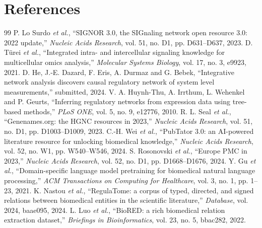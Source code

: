 \documentclass[11pt,a4paper]{article}
\begin{document}
\section{References}

\begingroup
\renewcommand{\section}[2]{}
\fontsize{10.5}{13}\selectfont
\setlength{\parskip}{0pt}
\begin{thebibliography}{99}
\setlength{\itemsep}{0.2em}
 P. Lo Surdo \emph{et al.}, ``SIGNOR 3.0, the SIGnaling network open resource
  3.0: 2022 update,'' \emph{Nucleic Acids Research}, vol. 51, no. D1, pp. D631--D637, 2023.
 D. T\"urei \emph{et al.}, ``Integrated intra- and intercellular signaling
  knowledge for multicellular omics analysis,'' \emph{Molecular Systems Biology}, vol. 17,
  no. 3, e9923, 2021.
 D. He, J.-E. Dazard, F. Eris, A. Durmaz and G. Bebek, ``Integrative network
  analysis discovers causal regulatory network of system level measurements,'' submitted, 2024.
 V. A. Huynh-Thu, A. Irrthum, L. Wehenkel and P. Geurts, ``Inferring regulatory
  networks from expression data using tree-based methods,'' \emph{PLoS ONE}, vol. 5, no. 9,
  e12776, 2010.
 R. L. Seal \emph{et al.}, ``Genenames.org: the HGNC resources in 2023,''
  \emph{Nucleic Acids Research}, vol. 51, no. D1, pp. D1003--D1009, 2023.
 C.-H. Wei \emph{et al.}, ``PubTator 3.0: an AI-powered literature resource
  for unlocking biomedical knowledge,'' \emph{Nucleic Acids Research}, vol. 52, no. W1,
  pp. W540--W546, 2024.
 S. Rosonovski \emph{et al.}, ``Europe PMC in 2023,'' \emph{Nucleic Acids
  Research}, vol. 52, no. D1, pp. D1668--D1676, 2024.
 Y. Gu \emph{et al.}, ``Domain-specific language model pretraining for
  biomedical natural language processing,'' \emph{ACM Transactions on Computing for Healthcare},
  vol. 3, no. 1, pp. 1--23, 2021.
 K. Nastou \emph{et al.}, ``RegulaTome: a corpus of typed, directed, and
  signed relations between biomedical entities in the scientific literature,'' \emph{Database},
  vol. 2024, baae095, 2024.
 L. Luo \emph{et al.}, ``BioRED: a rich biomedical relation extraction dataset,''
  \emph{Briefings in Bioinformatics}, vol. 23, no. 5, bbac282, 2022.

\end{thebibliography}
\end{document}
